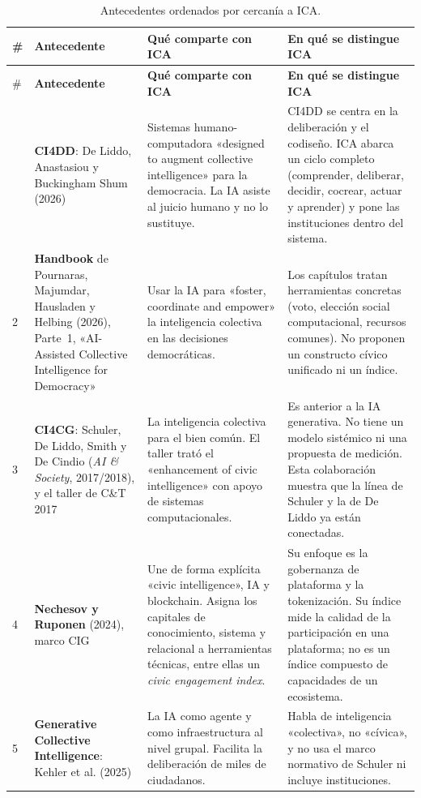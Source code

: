 \documentclass[11pt,a4paper]{article}
\begin{document}
{\small
\begin{longtable}{P{0.4cm}P{4.0cm}P{4.8cm}P{4.9cm}}
\caption{Antecedentes ordenados por cercanía a ICA.}\label{tab:solapes}\\
\toprule
\# & \textbf{Antecedente} & \textbf{Qué comparte con ICA} & \textbf{En qué se distingue ICA}\\
\midrule
\endfirsthead
\toprule
\# & \textbf{Antecedente} & \textbf{Qué comparte con ICA} & \textbf{En qué se distingue ICA}\\
\midrule
\endhead
\bottomrule
{} & \textbf{CI4DD}: De Liddo, Anastasiou y Buckingham Shum (2026) &
Sistemas humano-computadora «designed to augment collective intelligence» para la democracia. La IA asiste al juicio humano y no lo sustituye. &
CI4DD se centra en la deliberación y el codiseño. ICA abarca un ciclo completo (comprender, deliberar, decidir, cocrear, actuar y aprender) y pone las instituciones dentro del sistema.\\
2 & \textbf{Handbook} de Pournaras, Majumdar, Hausladen y Helbing (2026), Parte~1, «AI-Assisted Collective Intelligence for Democracy» &
Usar la IA para «foster, coordinate and empower» la inteligencia colectiva en las decisiones democráticas. &
Los capítulos tratan herramientas concretas (voto, elección social computacional, recursos comunes). No proponen un constructo cívico unificado ni un índice.\\
3 & \textbf{CI4CG}: Schuler, De Liddo, Smith y De Cindio (\emph{AI \& Society}, 2017/2018), y el taller de C\&T 2017 &
La inteligencia colectiva para el bien común. El taller trató el «enhancement of civic intelligence» con apoyo de sistemas computacionales. &
Es anterior a la IA generativa. No tiene un modelo sistémico ni una propuesta de medición. Esta colaboración muestra que la línea de Schuler y la de De Liddo ya están conectadas.\\
4 & \textbf{Nechesov y Ruponen} (2024), marco CIG &
Une de forma explícita «civic intelligence», IA y blockchain. Asigna los capitales de conocimiento, sistema y relacional a herramientas técnicas, entre ellas un \emph{civic engagement index}. &
Su enfoque es la gobernanza de plataforma y la tokenización. Su índice mide la calidad de la participación en una plataforma; no es un índice compuesto de capacidades de un ecosistema.\\
5 & \textbf{Generative Collective Intelligence}: Kehler et al. (2025) &
La IA como agente y como infraestructura al nivel grupal. Facilita la deliberación de miles de ciudadanos. &
Habla de inteligencia «colectiva», no «cívica», y no usa el marco normativo de Schuler ni incluye instituciones.\\

\end{longtable}}
\end{document}
